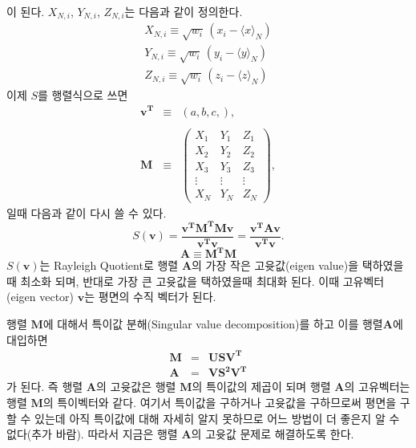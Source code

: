 \documentclass[chapter,a4paper,10pt]{oblivoir}
\begin{document}
이 된다. $X_{N,i}$, $Y_{N,i}$, $Z_{N,i}$는 다음과 같이 정의한다.
\begin{eqnarray}
X_{N,i} \equiv \sqrt{w_i}\,(x_i - \langle x \rangle_N)\\
Y_{N,i} \equiv \sqrt{w_i}\,(y_i - \langle y \rangle_N)\\
Z_{N,i} \equiv \sqrt{w_i}\,(z_i - \langle z \rangle_N)
\end{eqnarray}
이제 $S$를 행렬식으로 쓰면
\begin{eqnarray}
\mathbf{v^T} &\equiv& (a,b,c,), \\\nonumber\\
\mathbf{M}   &\equiv& \left( \begin{array}{ccc}
  X_1 & Y_1 & Z_1 \\
  X_2 & Y_2 & Z_2 \\
  X_3 & Y_3 & Z_3 \\
  \vdots & \vdots & \vdots \\
  X_N & Y_N & Z_N 
\end{array} \right),
\end{eqnarray}
일때 다음과 같이 다시 쓸 수 있다.
\begin{equation} \label{S_matrixform}
S(\mathbf v) = \frac{\mathbf{v^T}\mathbf{M^T}\mathbf{M}\mathbf{v}}{\mathbf{v^T}\mathbf{v}}
             = \frac{\mathbf{v^T}\mathbf{A}\mathbf{v}}{\mathbf{v^T}\mathbf{v}}.
\end{equation}
\begin{equation}
\mathbf{A}\equiv\mathbf{M^T}\mathbf{M}
\end{equation}
$S(\mathbf{v})$는 Rayleigh Quotient로 행렬 $\mathbf{A}$의 
가장 작은 고윳값(eigen value)을 택하였을때 최소화 되며, 반대로 가장 큰 고윳값을 택하였을때 최대화 된다.
이때 고유벡터(eigen vector) $\mathbf v$는 평면의 수직 벡터가 된다.

행렬 $\mathbf{M}$에 대해서 특이값 분해(Singular value decomposition)를 하고 이를 행렬$\mathbf{A}$에
대입하면
\begin{eqnarray}
\mathbf{M}&=&\mathbf{U}\mathbf{S}\mathbf{V^T} \\
\mathbf{A}&=&\mathbf{V}\mathbf{S^2}\mathbf{V^T} \label{def_A}
\end{eqnarray}
가 된다. 즉 행렬 $\mathbf{A}$의 고윳값은 행렬 $\mathbf{M}$의 특이값의 제곱이 되며 
행렬 $\mathbf{A}$의 고유벡터는 행렬 $\mathbf{M}$의 특이벡터와 같다.
여기서 특이값을 구하거나 고윳값을 구하므로써 평면을 구할 수 있는데 아직 특이값에 대해 자세히 알지 못하므로
어느 방법이 더 좋은지 알 수 없다(추가 바람).
따라서 지금은 행렬 $\mathbf{A}$의 고윳값 문제로 해결하도록 한다.
\end{document}
